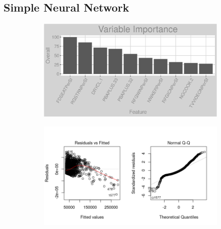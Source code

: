 \subsection{Simple Neural Network}
\label{appendix:natural_gas:snn}
\begin{figure}[h]
\centering
\begin{subfigure}{1\textwidth}
\centering
\includegraphics[width=.99\textwidth, height=0.3\textheight]{Images/natural_gas_psf_nn_vars.png}
\end{subfigure}
\begin{subfigure}{1\textwidth}
\centering
\includegraphics[width=.99\textwidth, height=0.475\textheight]{Images/natural_gas_psf_nn_res_1.png}
\end{subfigure}
\end{figure}
\FloatBarrier
\newpage
